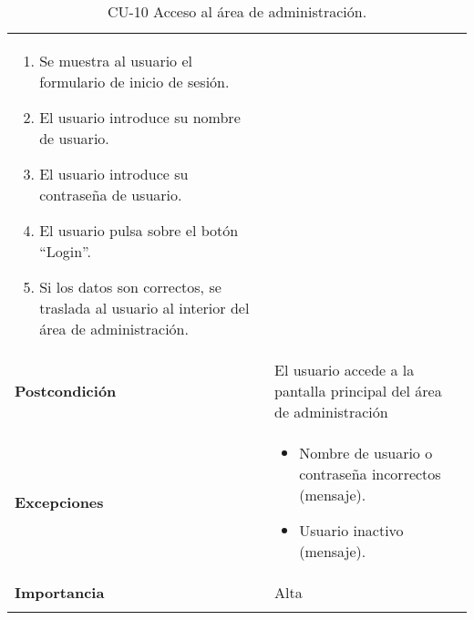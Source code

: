 \begin{longtable}[]{@{}ll@{}}
\begin{minipage}[t]{0.74\columnwidth}
\begin{enumerate}
\def\labelenumi{\arabic{enumi}.}
\tightlist
\item
  Se muestra al usuario el formulario de inicio de sesión.
\item
  El usuario introduce su nombre de usuario.
\item
  El usuario introduce su contraseña de usuario.
\item
  El usuario pulsa sobre el botón ``Login''.
\item
  Si los datos son correctos, se traslada al usuario al interior del
  área de administración.
\end{enumerate}\strut
\end{minipage}\tabularnewline
\begin{minipage}[t]{0.20\columnwidth}\raggedright
\textbf{Postcondición}\strut
\end{minipage} & \begin{minipage}[t]{0.74\columnwidth}\raggedright
El usuario accede a la pantalla principal del área de
administración\strut
\end{minipage}\tabularnewline
\begin{minipage}[t]{0.20\columnwidth}\raggedright
\textbf{Excepciones}\strut
\end{minipage} & \begin{minipage}[t]{0.74\columnwidth}\raggedright
\begin{itemize}
\tightlist
\item
  Nombre de usuario o contraseña incorrectos (mensaje).
\item
  Usuario inactivo (mensaje).
\end{itemize}\strut
\end{minipage}\tabularnewline
\begin{minipage}[t]{0.20\columnwidth}\raggedright
\textbf{Importancia}\strut
\end{minipage} & \begin{minipage}[t]{0.74\columnwidth}\raggedright
Alta\strut
\end{minipage}\tabularnewline
\bottomrule
\caption{CU-10 Acceso al área de administración.}
\end{longtable}

